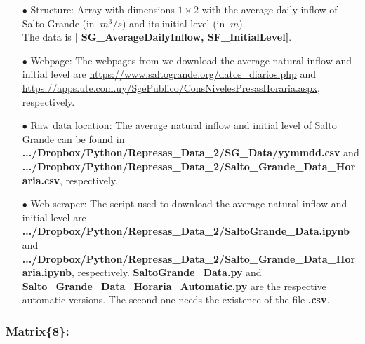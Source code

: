 \documentclass[12pt]{article}
\theoremstyle{definition}
\theoremstyle{remark}
\begin{document}
\begin{enumerate}

\item[$\bullet$] Structure: Array with dimensions $1\times2$ with the average daily inflow of Salto Grande (in $\SI{}{m^3/s}$) and its initial level (in $\SI{}{m}$).\\
The data is [\textbf{{\color{blue} SG\_AverageDailyInflow, SF\_InitialLevel}]}.

\item[$\bullet$] Webpage: The webpages from we download the average natural inflow and initial level are {\color{blue} \url{https://www.saltogrande.org/datos_diarios.php}} and {\color{blue} \url{https://apps.ute.com.uy/SgePublico/ConsNivelesPresasHoraria.aspx}}, respectively.

\item[$\bullet$] Raw data location: The average natural inflow and initial level of Salto Grande can be found in \textbf{.../Dropbox/Python/Represas\_Data\_2/SG\_Data/yymmdd.csv} and \textbf{.../Dropbox/Python/Represas\_Data\_2/Salto\_Grande\_Data\_Horaria.csv}, respectively.

\item[$\bullet$] Web scraper: The script used to download the average natural inflow and initial level are \textbf{.../Dropbox/Python/Represas\_Data\_2/SaltoGrande\_Data.ipynb} and \textbf{.../Dropbox/Python/Represas\_Data\_2/Salto\_Grande\_Data\_Horaria.ipynb}, respectively. \textbf{SaltoGrande\_Data.py} and \textbf{Salto\_Grande\_Data\_Horaria\_Automatic.py} are the respective automatic versions. The second one needs the existence of the file \textbf{.csv}.

\end{enumerate}

\subsubsection{Matrix\{8\}:}
\end{document}
